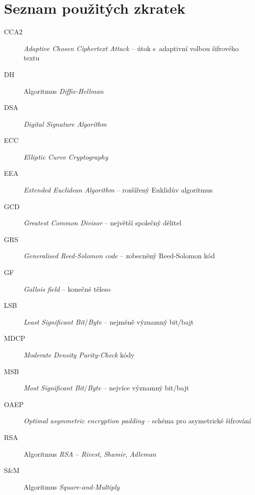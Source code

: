 \documentclass[thesis=M,czech,hidelinks]{FITthesis}[2012/06/26]
\newcommand{\0}{{\textcolor[gray]{0.80}{0}}}
\begin{document}
\chapter{Seznam použitých zkratek}
\begin{description}
        \item[CCA2] \emph{Adaptive Chosen Ciphertext Attack} -- útok s~adaptivní volbou šifrového textu
        \item[DH]   Algoritmus \emph{Diffie-Hellman}
        \item[DSA]  \emph{Digital Signature Algorithm}
        \item[ECC]  \emph{Elliptic Curve Cryptography}
        \item[EEA]  \emph{Extended Euclidean Algorithm} -- rozšířený Euklidův algoritmus
        \item[GCD]  \emph{Greatest Common Divisor} -- největší společný dělitel
        \item[GRS]  \emph{Generalised Reed-Solomon code} -- zobecněný Reed-Solomon kód
        \item[GF]   \emph{Gallois field} -- konečné těleso
        \item[LSB]  \emph{Least Significant Bit}/\emph{Byte} -- nejméně významný bit/bajt
        \item[MDCP] \emph{Moderate Density Parity-Check} kódy
        \item[MSB]  \emph{Most Significant Bit}/\emph{Byte} -- nejvíce významný bit/bajt
        \item[OAEP] \emph{Optimal asymmetric encryption padding} -- schéma pro asymetrické šifrování
        \item[RSA]  Algoritmus \emph{RSA} -- \emph{Rivest}, \emph{Shamir}, \emph{Adleman}
        \item[S\&M] Algoritmus \emph{Square-and-Multiply}
\end{description}


\end{document}
